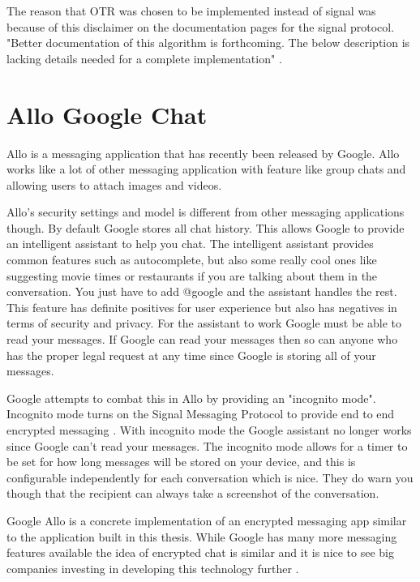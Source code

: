 The reason that OTR was chosen to be implemented instead of signal was because of this disclaimer on the documentation pages for the signal protocol. "Better documentation of this algorithm is forthcoming. The below description is lacking details needed for a complete implementation" \cite{whisper-protocol}.


\section{Allo Google Chat}


Allo is a messaging application that has recently been released by Google. Allo works like a lot of other messaging application with feature like group chats and allowing users to attach images and videos. 


Allo's security settings and model is different from other messaging applications though. By default Google stores all chat history. This allows Google to provide an intelligent assistant to help you chat. The intelligent assistant provides common features such as autocomplete, but also some really cool ones like suggesting movie times or restaurants if you are talking about them in the conversation. You just have to add @google and the assistant handles the rest. This feature has definite positives for user experience but also has negatives in terms of security and privacy. For the assistant to work Google must be able to read your messages. If Google can read your messages then so can anyone who has the proper legal request at any time since Google is storing all of your messages.


Google attempts to combat this in Allo by providing an "incognito mode". Incognito mode turns on  the Signal Messaging Protocol to provide end to end encrypted messaging \cite{whisper-allo}. With incognito mode the Google assistant no longer works since Google can't read your messages. The incognito mode allows for a timer to be set for how long messages will be stored on your device, and this is configurable independently for each conversation which is nice. They do warn you though that the recipient can always take a screenshot of the conversation.


Google Allo is a concrete implementation of an encrypted messaging app similar to the application built in this thesis. While Google has many more messaging features available the idea of encrypted chat is similar and it is nice to see big companies investing in developing this technology further \cite{google-allo}.


